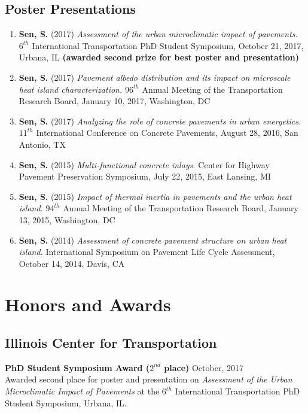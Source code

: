 \documentclass[12pt]{article}
\begin{document}
\subsection*{Poster Presentations}
\begin{enumerate}[label=(\arabic*)]
	\item \textbf{Sen, S.} (2017) \textit{Assessment of the urban microclimatic impact of pavements.} $6^{th}$ International Transportation PhD Student Symposium, October 21, 2017, Urbana, IL \textbf{(awarded second prize for best poster and presentation)}
	\item \textbf{Sen, S.} (2017) \textit{Pavement albedo distribution and its impact on microscale heat island characterization.} $96^{th}$ Annual Meeting of the Transportation Research Board, January 10, 2017, Washington, DC
	\item \textbf{Sen, S.} (2017) \textit{Analyzing the role of concrete pavements in urban energetics.} $11^{th}$ International Conference on Concrete Pavements, August 28, 2016, San Antonio, TX
	\item \textbf{Sen, S.} (2015) \textit{Multi-functional concrete inlays.} Center for Highway Pavement Preservation Symposium, July 22, 2015, East Lansing, MI
	\item \textbf{Sen, S.} (2015) \textit{Impact of thermal inertia in pavements and the urban heat island.} $94^{th}$ Annual Meeting of the Transportation Research Board, January 13, 2015, Washington, DC
	\item \textbf{Sen, S.} (2014) \textit{Assessment of concrete pavement structure on urban heat island.} International Symposium on Pavement Life Cycle Assessment, October 14, 2014, Davis, CA
\end{enumerate}

\section*{Honors and Awards}
\subsection*{Illinois Center for Transportation}
\textbf{PhD Student Symposium Award ($2^{nd}$ place)} \hfill October, 2017 \\
Awarded second place for poster and presentation on \textit{Assessment of the Urban Microclimatic Impact of Pavements} at the $6^{th}$ International Transportation PhD Student Symposium, Urbana, IL. \\
\end{document}
